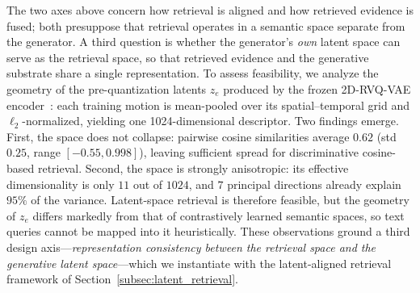 \noindent {}
The two axes above concern how retrieval is aligned and how retrieved evidence is fused; both presuppose that retrieval operates in a semantic space separate from the generator. A third question is whether the generator's \emph{own} latent space can serve as the retrieval space, so that retrieved evidence and the generative substrate share a single representation. To assess feasibility, we analyze the geometry of the pre-quantization latents $z_e$ produced by the frozen 2D-RVQ-VAE encoder~\cite{mogents}: each training motion is mean-pooled over its spatial--temporal grid and $\ell_2$-normalized, yielding one 1024-dimensional descriptor. Two findings emerge. First, the space does not collapse: pairwise cosine similarities average $0.62$ (std $0.25$, range $[-0.55, 0.998]$), leaving sufficient spread for discriminative cosine-based retrieval. Second, the space is strongly anisotropic: its effective dimensionality is only $11$ out of $1024$, and $7$ principal directions already explain $95\%$ of the variance. Latent-space retrieval is therefore feasible, but the geometry of $z_e$ differs markedly from that of contrastively learned semantic spaces, so text queries cannot be mapped into it heuristically. These observations ground a third design axis---\emph{representation consistency between the retrieval space and the generative latent space}---which we instantiate with the latent-aligned retrieval framework of Section~\ref{subsec:latent_retrieval}.



